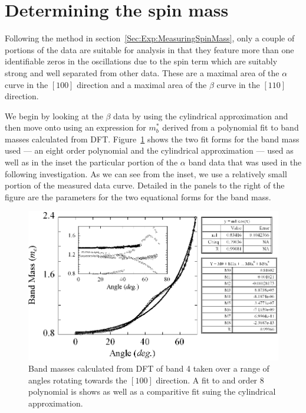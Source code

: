 
\section{Determining the spin mass}

Following the method in section~\ref{Sec:Exp:MeasuringSpinMass}, only a couple of portions of the data are suitable for analysis in that they feature more than one identifiable zeros in the oscillations due to the spin term which are suitably strong and well separated from other data. These are a maximal area of the $\alpha$ curve in the $[100]$ direction and a maximal area of the $\beta$ curve in the $[110]$ direction.

We begin by looking at the $\beta$ data by using the cylindrical approximation and then move onto using an expression for $m^*_b$ derived from a polynomial fit to band masses calculated from \ac{DFT}. Figure~\ref{Fig:ResD:DFTBandMassBand4} shows the two fit forms for the band mass used --- an eight order polynomial and the cylindrical approximation --- used as well as in the inset the particular portion of the $\alpha$ band data that was used in the following investigation. As we can see from the inset, we use a relatively small portion of the measured data curve. Detailed in the panels to the right of the figure are the parameters for the two equational forms for the band mass.
\begin{figure}[htbp]
    \begin{center}
        \includegraphics[scale=0.8]{Chapter-dHvABaFe2P2/Figures/Mass/DFTBandMassBand4/DFTBandMassBand4}
        \caption{Band masses calculated from \ac{DFT} of band 4 taken over a range of angles rotating towards the $[100]$ direction. A fit to and order 8 polynomial is shows as well as a comparitive fit suing the cylindrical approximation.}
        \label{Fig:ResD:DFTBandMassBand4}
    \end{center}
\end{figure}
